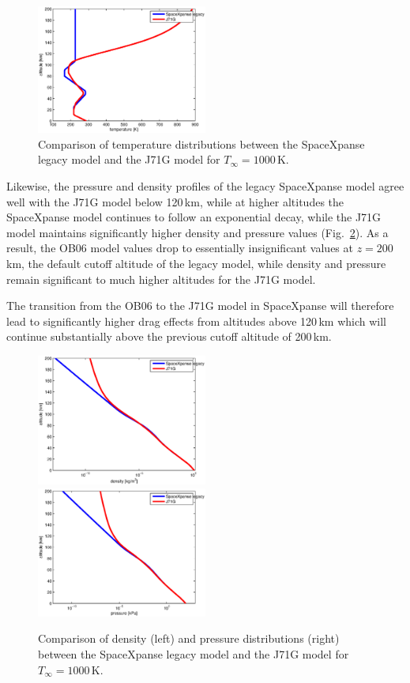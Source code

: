 \documentclass[a4paper]{article}
\begin{document}
\begin{figure}
\includegraphics[width=0.5\textwidth]{ob_j71g_temp.eps}
\caption{Comparison of temperature distributions between the SpaceXpanse legacy model and the J71G model for $T_\infty=1000$\,K.}
\label{fig:ob_j71g_temp}
\end{figure}
Likewise, the pressure and density profiles of the legacy SpaceXpanse model agree well with the J71G model below 120\,km, while at higher altitudes the SpaceXpanse model continues to follow an exponential decay, while the J71G model maintains significantly higher density and pressure values (Fig.~\ref{fig:ob_j71g_dens_prs}).
As a result, the OB06 model values drop to essentially insignificant values at $z=200$\,km, the default cutoff altitude of the legacy model, while density and pressure remain significant to much higher altitudes for the J71G model.

The transition from the OB06 to the J71G model in SpaceXpanse will therefore lead to significantly higher drag effects from altitudes above 120\,km which will continue substantially above the previous cutoff altitude of 200\,km.

\begin{figure}
\includegraphics[width=0.5\textwidth]{ob_j71g_dens.eps}
\includegraphics[width=0.5\textwidth]{ob_j71g_prs.eps}
\caption{Comparison of density (left) and pressure distributions (right) between the SpaceXpanse legacy model and the J71G model for $T_\infty=1000$\,K.}
\label{fig:ob_j71g_dens_prs}
\end{figure}
\end{document}
